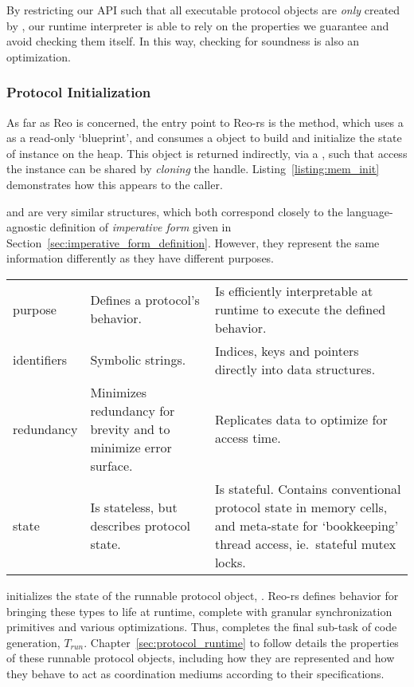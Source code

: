 By restricting our API such that all executable protocol objects are \textit{only} created by , our runtime interpreter is able to rely on the properties we guarantee and avoid checking them itself. In this way, checking for soundness is also an optimization.


\subsubsection{Protocol Initialization}
As far as Reo is concerned, the entry point to Reo-rs is the  method, which uses a  as a read-only `blueprint', and consumes a  object to build and initialize the state of  instance on the heap. This object is returned indirectly, via a , such that access the  instance can be shared by \textit{cloning} the handle. Listing~\ref{listing:mem_init} demonstrates how this appears to the caller.

 and  are very similar structures, which both correspond closely to the language-agnostic definition of \textit{imperative form} given in Section~\ref{sec:imperative_form_definition}. However, they represent the same information differently as they have different purposes.

\noindent{}
\begin{footnotesize}
	\begin{tabular}{l|p{50mm}p{60mm}}
		& \code{ProtoDef}  & \code{Proto} \\
		\hline
		purpose & Defines a protocol's behavior. & Is efficiently interpretable at runtime to execute the defined behavior. \\
		identifiers & Symbolic strings. & Indices, keys and pointers directly into data structures. \\
		redundancy & Minimizes redundancy for brevity and to minimize error surface. & Replicates data to optimize for access time. \\
		state & Is stateless, but describes protocol state. & Is stateful. Contains conventional protocol state in memory cells, and meta-state for `bookkeeping' thread access, ie.\ stateful mutex locks.
	\end{tabular}
\end{footnotesize}
\vspace{1em}

 initializes the state of the runnable protocol object, . Reo-rs defines behavior for bringing these types to life at runtime, complete with granular synchronization primitives and various optimizations. Thus,  completes the final sub-task of code generation, $T_{run}$. Chapter~\ref{sec:protocol_runtime} to follow details the properties of these runnable protocol objects, including how they are represented and how they behave to act as coordination mediums according to their  specifications.
